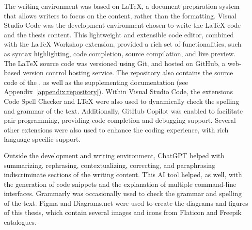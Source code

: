The writing environment was based on \LaTeX{}, a document preparation system that allows writers to focus on the content, rather than the formatting. Visual Studio Code was the development environment chosen to write the \LaTeX{} code and the thesis content. This lightweight and extensible code editor, combined with the LaTeX Workshop extension, provided a rich set of functionalities, such as syntax highlighting, code completion, source compilation, and live preview. The \LaTeX{} source code was versioned using Git, and hosted on GitHub, a web-based version control hosting service. The repository also contains the source code of the \poc{}, as well as the supplementing documentation (see Appendix~\ref{appendix:repository}). Within Visual Studio Code, the extensions Code Spell Checker and LTeX were also used to dynamically check the spelling and grammar of the text. Additionally, GitHub Copilot was enabled to facilitate pair programming, providing code completion and debugging support. Several other extensions were also used to enhance the coding experience, with rich language-specific support.

Outside the development and writing environment, ChatGPT helped with summarizing, rephrasing, contextualizing, correcting, and paraphrasing indiscriminate sections of the writing content. This AI tool helped, as well, with the generation of code snippets and the explanation of multiple command-line interfaces. Grammarly was occasionally used to check the grammar and spelling of the text. Figma and Diagrams.net were used to create the diagrams and figures of this thesis, which contain several images and icons from Flaticon and Freepik catalogues.